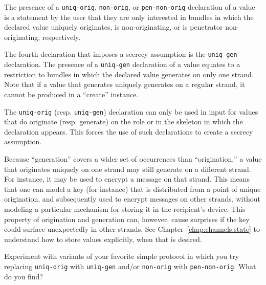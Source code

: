    The
presence of a \texttt{uniq-orig}, \texttt{non-orig}, or
\texttt{pen-non-orig} declaration of a value is a statement by the
user that they are only interested in bundles in which the declared
value uniquely originates, is non-originating, or is penetrator
non-originating, respectively.

 The fourth declaration that imposes a secrecy
assumption is the \texttt{uniq-gen} declaration.  The presence of a
\texttt{uniq-gen} declaration of a value equates to a restriction to
bundles in which the declared value generates on only one strand.
Note that if a value that generates uniquely generates on a regular
strand, it cannot be produced in a ``create'' instance.

The \texttt{uniq-orig} (resp. \texttt{uniq-gen}) declaration can only
be used in {\cpsa} input for values that do originate (resp. generate)
on the role or in the skeleton in which the declaration appears.  This
forces the use of such declarations to create a secrecy assumption.

Because ``generation'' covers a wider set of occurrences than
``origination,'' a value that originates uniquely on one strand may
still generate on a different strand.  For instance, it may be used to
encrypt a message on that strand.  This means that one can model a key
(for instance) that is distributed from a point of unique origination,
and subsequently used to encrypt messages on other strands, without
modeling a particular mechanism for storing it in the recipient's
device.  This property of origination and generation can, however,
cause surprises if the key could surface unexpectedly in other
strands.  See Chapter~\ref{chap:channels:state} to understand how to
store values explicitly, when that is desired.


\begin{exercise}
Experiment with variants of your favorite simple protocol in which you
try replacing \texttt{uniq-orig} with \texttt{uniq-gen} and/or
\texttt{non-orig} with \texttt{pen-non-orig}.  What do you find?
\end{exercise}

